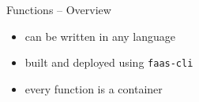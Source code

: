 \begin{frame}{Functions -- Overview}
  \begin{itemize}
    \item can be written in any language
    \item built and deployed using \texttt{faas-cli}
    \item every function is a container
  \end{itemize}
\end{frame}
